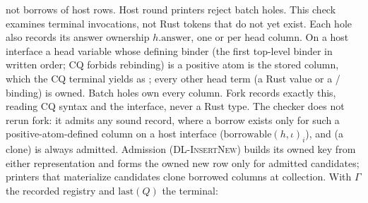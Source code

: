 not borrows of host rows. Host round printers reject batch holes.
This check examines terminal invocations, not Rust tokens that do not yet exist.
Each hole also records its answer ownership $h.\mathrm{answer}$, one
 or  per head column. On a host interface a head
variable whose defining binder (the first top-level binder in written order;
CQ forbids rebinding) is a positive atom is the stored column, which the CQ
terminal yields as ; every other head term (a Rust value or a
/ binding) is owned. Batch holes own every column. Fork
records exactly this, reading CQ syntax and the interface, never a Rust type.
The checker does not rerun fork: it admits any sound record, where a borrow
exists only for such a positive-atom-defined column on a host interface
($\mathrm{borrowable}(h,\iota)_i$), and  (a clone) is always
admitted. Admission (\textsc{DL-InsertNew}) builds its owned key from either
representation and forms the owned new row only for admitted candidates;
printers that materialize candidates clone borrowed columns at collection.
With $\Gamma$ the recorded registry and $\mathrm{last}(Q)$ the terminal:
